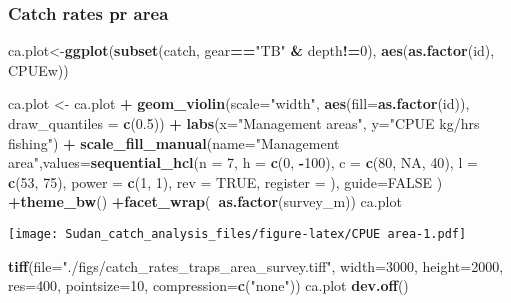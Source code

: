 \documentclass[]{article}
\newenvironment{Shaded}{\begin{snugshade}}{\end{snugshade}}
\newcommand{\KeywordTok}[1]{\textcolor[rgb]{0.13,0.29,0.53}{\textbf{#1}}}
\newcommand{\DataTypeTok}[1]{\textcolor[rgb]{0.13,0.29,0.53}{#1}}
\newcommand{\DecValTok}[1]{\textcolor[rgb]{0.00,0.00,0.81}{#1}}
\newcommand{\FloatTok}[1]{\textcolor[rgb]{0.00,0.00,0.81}{#1}}
\newcommand{\StringTok}[1]{\textcolor[rgb]{0.31,0.60,0.02}{#1}}
\newcommand{\OtherTok}[1]{\textcolor[rgb]{0.56,0.35,0.01}{#1}}
\newcommand{\OperatorTok}[1]{\textcolor[rgb]{0.81,0.36,0.00}{\textbf{#1}}}
\newcommand{\NormalTok}[1]{#1}
\begin{document}
\subsubsection{Catch rates pr area}\label{catch-rates-pr-area}

\begin{Shaded}
\begin{Highlighting}[]
\NormalTok{ca.plot<-}\KeywordTok{ggplot}\NormalTok{(}\KeywordTok{subset}\NormalTok{(catch, gear}\OperatorTok{==}\StringTok{"TB"} \OperatorTok{&}\StringTok{ }\NormalTok{depth}\OperatorTok{!=}\DecValTok{0}\NormalTok{), }\KeywordTok{aes}\NormalTok{(}\KeywordTok{as.factor}\NormalTok{(id), CPUEw))}

\NormalTok{ca.plot <-}\StringTok{ }\NormalTok{ca.plot }\OperatorTok{+}\StringTok{ }\KeywordTok{geom_violin}\NormalTok{(}\DataTypeTok{scale=}\StringTok{"width"}\NormalTok{, }\KeywordTok{aes}\NormalTok{(}\DataTypeTok{fill=}\KeywordTok{as.factor}\NormalTok{(id)), }\DataTypeTok{draw_quantiles =} \KeywordTok{c}\NormalTok{(}\FloatTok{0.5}\NormalTok{))  }\OperatorTok{+}\StringTok{ }\KeywordTok{labs}\NormalTok{(}\DataTypeTok{x=}\StringTok{"Management areas"}\NormalTok{, }\DataTypeTok{y=}\StringTok{"CPUE kg/hrs fishing"}\NormalTok{) }\OperatorTok{+}\StringTok{ }\KeywordTok{scale_fill_manual}\NormalTok{(}\DataTypeTok{name=}\StringTok{"Management area"}\NormalTok{,}\DataTypeTok{values=}\KeywordTok{sequential_hcl}\NormalTok{(}\DataTypeTok{n =} \DecValTok{7}\NormalTok{, }\DataTypeTok{h =} \KeywordTok{c}\NormalTok{(}\DecValTok{0}\NormalTok{, }\OperatorTok{-}\DecValTok{100}\NormalTok{), }\DataTypeTok{c =} \KeywordTok{c}\NormalTok{(}\DecValTok{80}\NormalTok{, }\OtherTok{NA}\NormalTok{, }\DecValTok{40}\NormalTok{), }\DataTypeTok{l =} \KeywordTok{c}\NormalTok{(}\DecValTok{53}\NormalTok{, }\DecValTok{75}\NormalTok{), }\DataTypeTok{power =} \KeywordTok{c}\NormalTok{(}\DecValTok{1}\NormalTok{, }\DecValTok{1}\NormalTok{), }\DataTypeTok{rev =} \OtherTok{TRUE}\NormalTok{, }\DataTypeTok{register =}\NormalTok{ ), }\DataTypeTok{guide=}\OtherTok{FALSE}\NormalTok{ ) }\OperatorTok{+}\KeywordTok{theme_bw}\NormalTok{() }\OperatorTok{+}\KeywordTok{facet_wrap}\NormalTok{(}\OperatorTok{~}\KeywordTok{as.factor}\NormalTok{(survey_m))}
\NormalTok{ca.plot}
\end{Highlighting}
\end{Shaded}

\texttt{[image: Sudan\_catch\_analysis\_files/figure-latex/CPUE area-1.pdf]}

\begin{Shaded}
\begin{Highlighting}[]
\KeywordTok{tiff}\NormalTok{(}\DataTypeTok{file=}\StringTok{"./figs/catch_rates_traps_area_survey.tiff"}\NormalTok{, }\DataTypeTok{width=}\DecValTok{3000}\NormalTok{, }\DataTypeTok{height=}\DecValTok{2000}\NormalTok{, }\DataTypeTok{res=}\DecValTok{400}\NormalTok{, }\DataTypeTok{pointsize=}\DecValTok{10}\NormalTok{, }\DataTypeTok{compression=}\KeywordTok{c}\NormalTok{(}\StringTok{"none"}\NormalTok{))}
\NormalTok{ca.plot}
\KeywordTok{dev.off}\NormalTok{()}
\end{Highlighting}
\end{Shaded}
\end{document}
